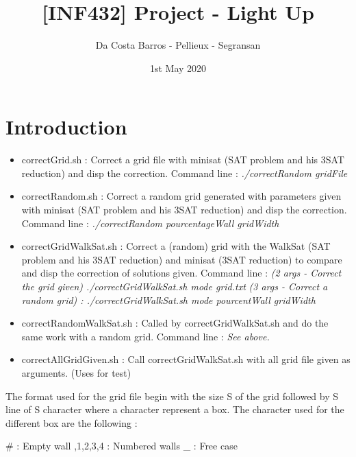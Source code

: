 \documentclass[a4paper]{article}
\title{[INF432] Project - Light Up}
\date{1st May 2020}
\author{Da Costa Barros - Pellieux - Segransan}
\begin{document}
 

\maketitle

\pagestyle{fancy}

\section*{Introduction}


\begin{itemize}

\item correctGrid.sh : Correct a grid file with minisat (SAT problem and his 3SAT reduction) and disp the correction.
\newline
Command line : \textit{./correctRandom gridFile}
\item correctRandom.sh : Correct a random grid generated with parameters given  with minisat (SAT problem and his 3SAT reduction) and disp the correction.
\newline
Command line : \textit{./correctRandom pourcentageWall gridWidth}
\item correctGridWalkSat.sh : Correct a (random) grid with the WalkSat (SAT problem and his 3SAT reduction) and minisat (3SAT reduction) to compare and disp the correction of solutions given.
\newline
Command line : \textit{(2 args - Correct the grid given) ./correctGridWalkSat.sh mode grid.txt}
\newline
\textit{(3 args - Correct a random grid) : ./correctGridWalkSat.sh mode pourcentWall gridWidth}
\item correctRandomWalkSat.sh : Called by correctGridWalkSat.sh and do the same work with a random grid.
\newline
Command line : \textit{See above.}
\item correctAllGridGiven.sh : Call correctGridWalkSat.sh with all grid file given as arguments. (Uses for test)

\end{itemize}
The format used for the grid file begin with the size S of the grid followed by S line of S character where a character represent a box. The character used for the different box are the following :
\begin{center}
 \# : Empty wall ,1,2,3,4 : Numbered walls \qquad \_ : Free case
\end{center}
\end{document}
